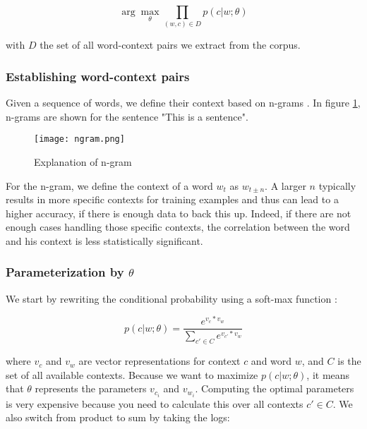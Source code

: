 \begin{equation} 
\label{eq:skipgramMax}
\arg \max_{\theta} \prod_{(w,c) \in D} p(c|w;\theta)
\end{equation}

\noindent with $D$ the set of all word-context pairs we extract from the corpus.


\subsubsection{Establishing word-context pairs}

Given a sequence of words, we define their context based on n-grams \cite{w2vNgram:article}. In figure \ref{fig:ngram}, n-grams are shown for the sentence "This is a sentence". 

\begin{figure}[htbp]
	\centering
	\texttt{[image: ngram.png]}
	\caption{Explanation of n-gram \cite{w2vNgram:online}}
	\label{fig:ngram}
\end{figure} 

For the n-gram, we define the context of a word $w_t$ as $w_{t \pm n}$. A larger $n$ typically results in more specific contexts for training examples and thus can lead to a higher accuracy, if there is enough data to back this up. Indeed, if there are not enough cases handling those specific contexts, the correlation between the word and his context is less statistically significant.


\subsubsection{Parameterization by $\theta$}
\label{sec:parameterization}

We start by rewriting the conditional probability using a soft-max function \cite{softmax:article}:

\begin{equation} 
p(c|w;\theta) = \frac{e^{v_c*v_w}}{\sum_{c' \in C}e^{v_{c'}*v_w}}
\end{equation}

\noindent where $v_c$ and $v_w$ are vector representations for context $c$ and word $w$, and $C$ is the set of all available contexts. Because we want to maximize $p(c|w;\theta)$, it means that $\theta$ represents the parameters $v_{c_i}$ and $v_{w_i}$. Computing the optimal parameters is very expensive because you need to calculate this over all contexts $c' \in C$. We also switch from product to sum by taking the logs:

